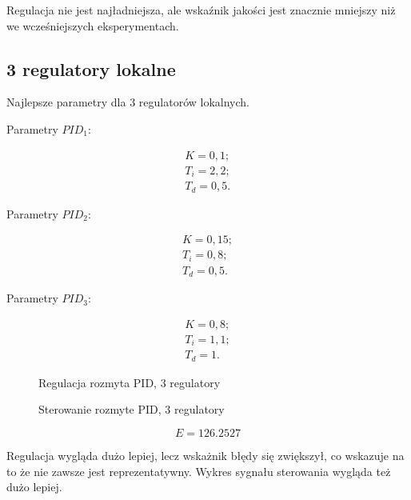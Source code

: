 Regulacja nie jest najładniejsza, ale wskaźnik jakości jest znacznie mniejszy niż we wcześniejszych eksperymentach.

\subsection{3 regulatory lokalne}

Najlepsze parametry dla 3 regulatorów lokalnych.

Parametry $PID_1$:

\begin{equation}
\begin{matrix}
    	K = 0,1;\\
    	T_i = 2,2;\\
    	T_d = 0,5.
\end{matrix}
\end{equation}

Parametry $PID_2$:

\begin{equation}
\begin{matrix}
    	K = 0,15;\\
    	T_i = 0,8;\\
    	T_d = 0,5.
\end{matrix}
\end{equation}

Parametry $PID_3$:

\begin{equation}
\begin{matrix}
    	K = 0,8;\\
    	T_i = 1,1;\\
    	T_d = 1.
\end{matrix}
\end{equation}


\begin{figure}[H]
\centering

\caption{Regulacja rozmyta PID, 3 regulatory}
\end{figure}

\begin{figure}[H]
\centering

\caption{Sterowanie rozmyte PID, 3 regulatory}
\end{figure}

\begin{equation}
    E = \num{126,2527}
\end{equation}

Regulacja wygląda dużo lepiej, lecz wskażnik błędy się zwiększył, co wskazuje na to że nie zawsze jest reprezentatywny. Wykres sygnału sterowania wygląda też dużo lepiej.


